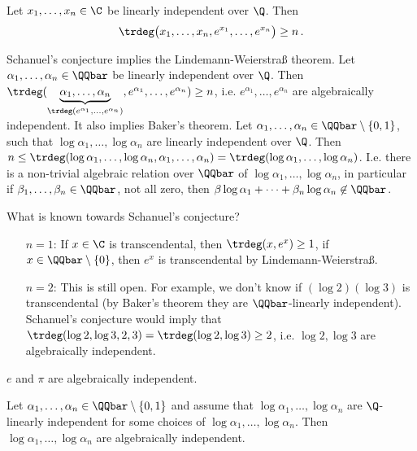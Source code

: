 \begin{conj}
	Let \( x_1, \dotsc, x_n \in \C \) be linearly independent over \( \Q \).
	Then
	\[ \trdeg \big( x_1, \dotsc, x_n, e^{x_1}, \dotsc, e^{x_n} \big) \geq n \,. \]
\end{conj}

Schanuel's conjecture implies the Lindemann-Weierstraß theorem.
Let \( \alpha_1, \dotsc, \alpha_n \in \QQbar \) be linearly independent over \( \Q \).
Then \( \trdeg (\underbrace{\alpha_1, \dotsc, \alpha_n}_{\trdeg(e^{\alpha_1}, \dotsc, e^{\alpha_n})}, e^{\alpha_1}, \dotsc, e^{\alpha_n}) \geq n \), i.e. \( e^{\alpha_1}, \dotsc, e^{\alpha_n} \) are algebraically independent.
It also implies Baker's theorem.
Let \( \alpha_1, \dotsc, \alpha_n \in \QQbar \setminus \{0,1\} \), such that \( \log \alpha_1, \dotsc, \log\alpha_n \) are linearly independent over \( \Q \).
Then \( n \leq \trdeg (\log\alpha_1, \dotsc, \log\alpha_n, \alpha_1, \dotsc, \alpha_n) = \trdeg(\log\alpha_1, \dotsc, \log\alpha_n) \).
I.e. there is a non-trivial algebraic relation over \( \QQbar \) of \( \log\alpha_1, \dotsc, \log\alpha_n \), in particular if \( \beta_1, \dotsc, \beta_n \in \QQbar \), not all zero, then \( \beta\log\alpha_1 + \dots + \beta_n\log\alpha_n \not\in \QQbar \).

What is known towards Schanuel's conjecture?
\begin{itemize}
	\item[\( n=1 \):] If \( x \in \C \) is transcendental, then \( \trdeg (x, e^x) \geq 1 \), if \( x \in \QQbar \setminus \{0\} \), then \( e^x \) is transcendental by Lindemann-Weierstraß.
	\item[\( n=2 \):] This is still open.
		For example, we don't know if \( (\log 2)(\log 3) \) is transcendental (by Baker's theorem they are \( \QQbar \)-linearly independent).
		Schanuel's conjecture would imply that \( \trdeg(\log 2, \log 3, 2, 3) = \trdeg(\log 2, \log 3) \geq 2 \), i.e. \( \log 2, \log 3 \) are algebraically independent.
\end{itemize}

\begin{conj}
	\( e \) and \( \pi \) are algebraically independent.
\end{conj}

\begin{conj}
	Let \( \alpha_1, \dotsc, \alpha_n \in \QQbar \setminus \{0,1\} \) and assume that \( \log\alpha_1, \dotsc, \log\alpha_n \) are \( \Q \)-linearly independent for some choices of \( \log\alpha_1, \dotsc, \log\alpha_n \).
	Then \( \log\alpha_1, \dotsc, \log\alpha_n \) are algebraically independent.
\end{conj}

